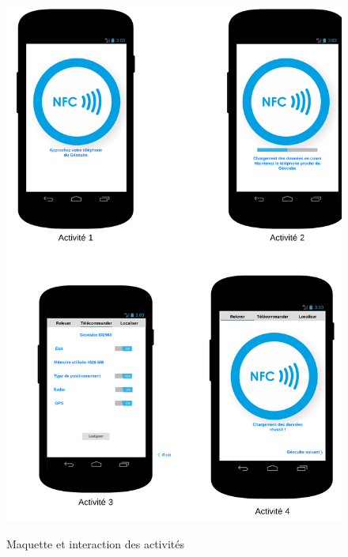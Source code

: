 \documentclass{themeensg}
\begin{document}
\begin{figure}
\centering
\includegraphics[scale=0.5]{images/activities.png}
\label{fig:android}
\caption{Maquette et interaction des activités}
\end{figure}
\end{document}
